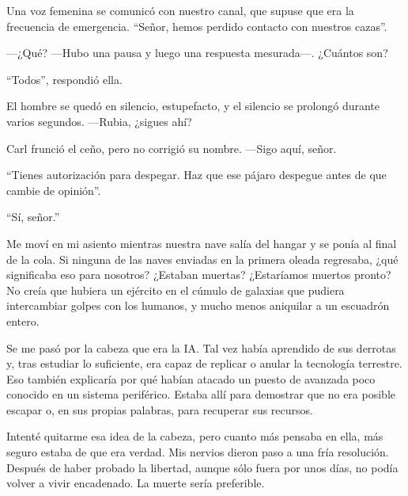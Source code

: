 Una voz femenina se comunicó con nuestro canal, que supuse que era la frecuencia de emergencia. ``Señor, hemos perdido contacto con nuestros cazas''.

—¿Qué? —Hubo una pausa y luego una respuesta mesurada—. ¿Cuántos son?

``Todos'', respondió ella.

El hombre se quedó en silencio, estupefacto, y el silencio se prolongó durante varios segundos. —Rubia, ¿sigues ahí?

Carl frunció el ceño, pero no corrigió su nombre. —Sigo aquí, señor.

``Tienes autorización para despegar. Haz que ese pájaro despegue antes de que cambie de opinión''.

``Sí, señor.''

Me moví en mi asiento mientras nuestra nave salía del hangar y se ponía al final de la cola. Si ninguna de las naves enviadas en la primera oleada regresaba, ¿qué significaba eso para nosotros? ¿Estaban muertas? ¿Estaríamos muertos pronto? No creía que hubiera un ejército en el cúmulo de galaxias que pudiera intercambiar golpes con los humanos, y mucho menos aniquilar a un escuadrón entero.

Se me pasó por la cabeza que era la IA. Tal vez había aprendido de sus derrotas y, tras estudiar lo suficiente, era capaz de replicar o anular la tecnología terrestre. Eso también explicaría por qué habían atacado un puesto de avanzada poco conocido en un sistema periférico. Estaba allí para demostrar que no era posible escapar o, en sus propias palabras, para recuperar sus recursos.

Intenté quitarme esa idea de la cabeza, pero cuanto más pensaba en ella, más seguro estaba de que era verdad. Mis nervios dieron paso a una fría resolución. Después de haber probado la libertad, aunque sólo fuera por unos días, no podía volver a vivir encadenado. La muerte sería preferible.